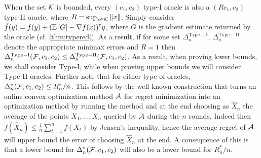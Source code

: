 When the set $\mathcal{K}$ is bounded, every $(c_1,c_2)$ type-I oracle is also a $(R c_1,c_2)$ type-II oracle,
where $R = \sup_{x\in \mathcal{K}} \|x\|$: Simply consider $\tilde{f}(y) =  f(y) + (\mathbb{E}\left[G\right]-\nabla f(x))^\mathsf{\scriptscriptstyle T} y $,  
where $G$ is the gradient estimate returned by the oracle (cf. \cref{thm:typered}). 
As a result, if for some set $\Delta_{n}^{\mathrm{Type-I}}$, $\Delta_{n}^{\mathrm{Type-II}}$ 
denote the appropriate minimax errors and $R=1$
then $\Delta_{n}^{\mathrm{Type-I}}(\mathcal{F},c_1,c_2) \le \Delta_{n}^{\mathrm{Type-II}}(\mathcal{F}, c_1,c_2)  $.
As a result, when proving lower bounds, we shall consider Type-I, while when proving upper bounds we will consider Type-II oracles.
Further note that for either type of oracles, $\Delta_n^*(\mathcal{F},c_1,c_2) \le R_n^*/n$. This follows by the well known construction that turns an online convex optimization method $\mathcal{A}$ for regret minimization into an optimization method by running the method and at the end choosing as $\hat{X}_n$ the average of the points $X_1,\dots,X_n$ queried by $\mathcal{A}$ during the $n$ rounds.
Indeed then $f(\hat{X}_n) \le \frac1n \sum_{t=1}^n f(X_t)$ by Jensen's inequality, hence the average regret of $\mathcal{A}$ will upper bound the error of choosing $\hat{X}_n$ at the end.
A consequence of this is that a lower bound for $\Delta_n^*(\mathcal{F},c_1,c_2) $ will also be a lower bound for $R_n^*/n$.

